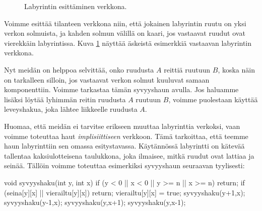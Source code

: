 \begin{figure}
\center
\begin{center}
\end{center}
\caption{Labyrintin esittäminen verkkona.}
\label{fig:labver}
\end{figure}

Voimme esittää tilanteen verkkona niin,
että jokainen labyrintin ruutu on yksi verkon solmuista,
ja kahden solmun välillä on kaari,
jos vastaavat ruudut ovat vierekkäin labyrintissa.
Kuva \ref{fig:labver} näyttää äskeistä esimerkkiä vastaavan
labyrintin verkkona.

Nyt meidän on helppoa selvittää, onko ruudusta $A$ reittiä
ruutuun $B$, koska näin on tarkalleen silloin,
jos vastaavat verkon solmut kuuluvat samaan komponenttiin.
Voimme tarkastaa tämän syvyyshaun avulla.
Jos haluamme lisäksi löytää lyhimmän reitin ruudusta $A$
ruutuun $B$, voimme puolestaan käyttää leveyshakua,
joka lähtee liikkeelle ruudusta $A$.

Huomaa, että meidän ei tarvitse erikseen muuttaa labyrinttia
verkoksi, vaan voimme toteuttaa haut \emph{implisiittiseen} verkkoon.
Tämä tarkoittaa, että teemme haun labyrinttiin sen omassa
esitystavassa. Käytännössä labyrintti on kätevää tallentaa kaksiulotteisena
taulukkona, joka ilmaisee, mitkä ruudut ovat lattiaa ja seinää.
Tällöin voimme toteuttaa esimerkiksi syvyyshaun seuraavan tyylisesti:

\begin{code}
void syvyyshaku(int y, int x) {
    if (y < 0 || x < 0 || y >= n || x >= n) return;
    if (seina[y][x] || vierailtu[y][x]) return;
    vierailtu[y][x] = true;
    syvyyshaku(y+1,x);
    syvyyshaku(y-1,x);
    syvyyshaku(y,x+1);
    syvyyshaku(y,x-1);
}
\end{code}


